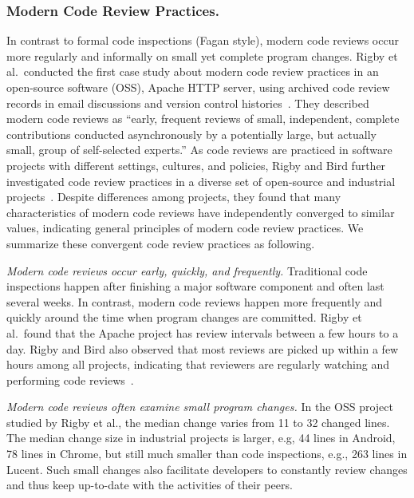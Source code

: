 \documentclass[runningheads,a4paper]{llncs}
\begin{document}
\subsubsection{Modern Code Review Practices.} 
In contrast to formal code inspections (Fagan style), modern code reviews occur more regularly and informally on small yet complete program changes. 
Rigby et al.~conducted the first case study about modern code review practices in an open-source software (OSS), Apache HTTP server, using archived code review records in email discussions and version control histories~\cite{Rigby2008:apache}. They described modern code reviews as ``early, frequent reviews of small, independent, complete contributions conducted asynchronously by a potentially large, but actually small, group of self-selected experts.'' As code reviews are practiced in software projects with different settings, cultures, and policies, Rigby and Bird further investigated code review practices in a diverse set of open-source and industrial projects~\cite{rigby2013convergent}. Despite differences among projects, they found that many characteristics of modern code reviews have independently converged to similar values, indicating general principles of modern code review practices. We summarize these convergent code review practices as following.

{\it Modern code reviews occur early, quickly, and frequently.} Traditional code inspections happen after finishing a major software component and often last several weeks. In contrast, modern code reviews happen more frequently and quickly around the time when program changes are committed. Rigby et al.~found that the Apache project has review intervals between a few hours to a day. Rigby and Bird also observed that most reviews are picked up within a few hours among all projects, indicating that reviewers are regularly watching and performing code reviews~\cite{rigby2013convergent}.

{\it Modern code reviews often examine small program changes.} In the OSS project studied by Rigby et al., the median change varies from 11 to 32 changed lines. The median change size in industrial projects is larger, e.g, 44 lines in Android, 78 lines in Chrome, but still much smaller than code inspections, e.g., 263 lines in Lucent. Such small changes also facilitate developers to constantly review changes and thus keep up-to-date with the activities of their peers. 
\end{document}
